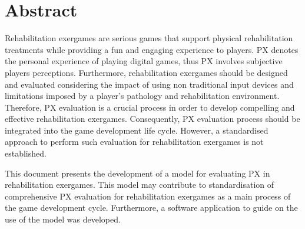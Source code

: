 

\begingroup
\let\clearpage\relax
\let\cleardoublepage\relax
\let\cleardoublepage\relax

\chapter*{Abstract} %

Rehabilitation exergames are serious games that support physical rehabilitation treatments while providing a fun and engaging  experience to players. \ac{PX} denotes the personal experience of playing digital games, thus \ac{PX} involves subjective players perceptions. Furthermore, rehabilitation exergames should be designed and evaluated considering the impact of using non traditional input devices and limitations imposed by a player's pathology and rehabilitation environment. Therefore, \ac{PX} evaluation is a crucial process in order to develop compelling and effective rehabilitation exergames. Consequently, \ac{PX} evaluation process should be integrated into the game development life cycle. However, a standardised approach to perform such evaluation for rehabilitation exergames is not established. 

This document presents the development of a model for evaluating \ac{PX} in rehabilitation exergames. This model may contribute to standardisation of comprehensive \ac{PX} evaluation for rehabilitation exergames as a main process of the game development cycle. Furthermore, a software application to guide on the use of the model was developed.
\endgroup			

\vfill